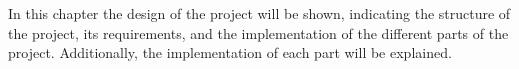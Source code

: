 In this chapter the design of the project will be shown, indicating the structure of the project, its requirements, and the implementation of the different parts of the project. Additionally, the implementation of each part will be explained.